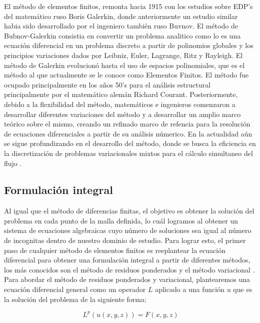 El método de elementos finitos, remonta hacia 1915 con los estudios sobre EDP's del matemático ruso Boris Galerkin, donde anteriormente un estudio similar habia sido desarrollado por el ingeniero también ruso Buvnov. El método de Bubnov-Galerkin consistia en convertir un problema analitico como lo es una ecuación diferencial en un problema discreto a partir de polinomios globales y los principios variaciones dados por Leibniz, Euler, Lagrange, Ritz y Rayleigh. El método de Galerkin evolucionó hasta el uso de espacios polinomiales, que es el método al que actualmente se le conoce como Elementos Finitos. El método fue ocupado principalmente en los años 50's para el análisis estructural principalmente por el matemático alemán Richard Courant. Posteriormente, debido a la flexibilidad del método, matemáticos e ingenieros comenzaron a desarrollar diferentes variaciones del método y a desarrollar un amplio marco teórico sobre el mismo, creando un  refinado marco de refencia para la resolución de ecuaciones diferenciales a partir de su análisis númerico. En la actualidad aún se sigue profundizando en el desarrollo del método, donde se busca la eficiencia en la discretización de problemas variacionales mixtos para el cálculo simultaneo del flujo \cite{Logg2012}.

\subsection{Formulación integral}

Al igual que el método de diferencias finitas, el objetivo es obtener la solución del problema en cada punto de la malla definida, lo cuál logramos al obtener un sistema de ecuaciones algebraicas cuyo número de soluciones sea igual al número de incognitas dentro de nuestro dominio de estudio. Para lograr esto, el primer paso de cualquier método de elementos finitos es reeplantear la ecuación diferencial para obtener una formulación integral a partir de diferentes métodos, los más conocidos son el método de residuos ponderados y el método variacional \cite{Istok1989}. 
\\

Para abordar el método de residuos ponderados y variacional, plantearemos una ecuación diferencial general como un operador $L$ aplicado a una función $u$ que es la solución del problema de la siguiente forma:

\begin{equation}
\label{eqn:fe1}
 \ L^{p}(u(x,y,z))=F(x,y,z)
\end{equation}

